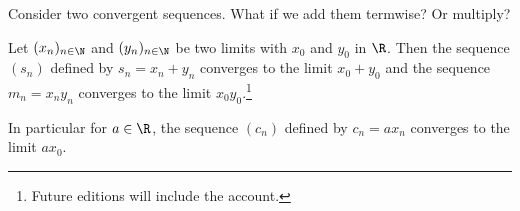 

Consider two convergent sequences.
What if we add them termwise?
Or multiply?


\begin{proposition}
Let $(x_n)_{n \in \N}$ and $(y_n)_{n \in \N}$ be two limits with $x_0$ and $y_0$ in $\R$.
   Then the sequence $(s_n)$ defined by $s_n = x_n + y_n$ converges to the limit $x_0+ y_0$ and the sequence $m_n = x_ny_n$ converges to the limit $x_0y_0$.\footnote{Future editions will include the account.}
\end{proposition}

In particular for $a \in \R$, the sequence $(c_n)$ defined by $c_n = ax_n$ converges to the limit $ax_0$.
\blankpage
